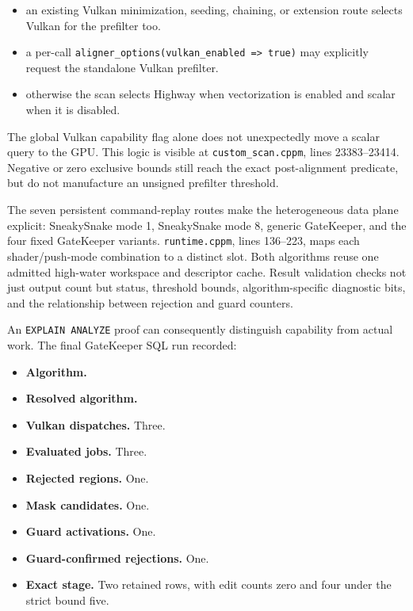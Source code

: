 \begin{itemize}
    \item an existing Vulkan minimization, seeding, chaining, or extension
    route selects Vulkan for the prefilter too.
    \item a per-call
    \texttt{aligner\_options(vulkan\_enabled => true)} may explicitly request
    the standalone Vulkan prefilter.
    \item otherwise the scan selects Highway when vectorization is enabled and
    scalar when it is disabled.
\end{itemize}

The global Vulkan capability flag alone does not unexpectedly move a scalar
query to the GPU.  This logic is visible at
\texttt{custom\_scan.cppm}, lines 23383--23414.  Negative or zero exclusive
bounds still reach the exact post-alignment predicate, but do not manufacture
an unsigned prefilter threshold.

The seven persistent command-replay routes make the heterogeneous data plane
explicit: SneakySnake mode 1, SneakySnake mode 8, generic GateKeeper, and the
four fixed GateKeeper variants.  \texttt{runtime.cppm}, lines 136--223, maps
each shader/push-mode combination to a distinct slot.  Both algorithms reuse
one admitted high-water workspace and descriptor cache.  Result validation
checks not just output count but status, threshold bounds, algorithm-specific
diagnostic bits, and the relationship between rejection and guard counters.

An \texttt{EXPLAIN ANALYZE} proof can consequently distinguish capability from
actual work.  The final GateKeeper SQL run recorded:

\begin{itemize}
    \item \textbf{Algorithm.}\\
    \item \textbf{Resolved algorithm.} 
    \item \textbf{Vulkan dispatches.} Three.
    \item \textbf{Evaluated jobs.} Three.
    \item \textbf{Rejected regions.} One.
    \item \textbf{Mask candidates.} One.
    \item \textbf{Guard activations.} One.
    \item \textbf{Guard-confirmed rejections.} One.
    \item \textbf{Exact stage.} Two retained rows, with edit counts zero and four under
    the strict bound five.
\end{itemize}

